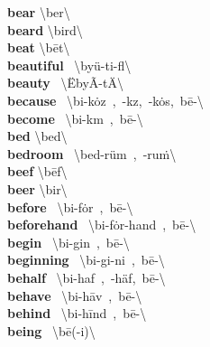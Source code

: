 \documentclass[10pt,a4paper]{article}
\begin{document}
\begin{multicols}{2}
\textbf{ bear }\quad \textbackslash \textprimstress ber\textbackslash \\
\textbf{ beard }\quad \textbackslash \textprimstress bird\textbackslash \\
\textbf{ beat }\quad \textbackslash \textprimstress b\={e}t\textbackslash \\
\textbf{ beautiful }\quad \ \textbackslash \textprimstress by\"{u}-ti-f\textschwa l\textbackslash \\
\textbf{ beauty }\quad \ \textbackslash \"{E}\textsuperscript{\pwedge}by\~{A}\textonequarter -t\"{A}\texttt{\textquotedbl}\textbackslash \\
\textbf{ because }\quad \ \textbackslash bi-\textprimstress k\.{o}z\ ,\ -\textprimstress k\textschwa z,\ -\textprimstress k\.{o}s,\ b\={e}-\textbackslash \\
\textbf{ become }\quad \ \textbackslash bi-\textprimstress k\textschwa m\ ,\ b\={e}-\textbackslash \\
\textbf{ bed }\quad \textbackslash \textprimstress bed\textbackslash \\
\textbf{ bedroom }\quad \ \textbackslash \textprimstress bed-\textsecstress r\"{u}m\ ,\ -\textsecstress ru\. m\textbackslash \\
\textbf{ beef }\quad \textbackslash \textprimstress b\={e}f\textbackslash \\
\textbf{ beer }\quad \textbackslash \textprimstress bir\textbackslash \\
\textbf{ before }\quad \ \textbackslash bi-\textprimstress f\.{o}r\ ,\ b\={e}-\textbackslash \\
\textbf{ beforehand }\quad \ \textbackslash bi-\textprimstress f\.{o}r-\textsecstress hand\ ,\ b\={e}-\textbackslash \\
\textbf{ begin }\quad \ \textbackslash bi-\textprimstress gin\ ,\ b\={e}-\textbackslash \\
\textbf{ beginning }\quad \ \textbackslash bi-\textprimstress gi-ni\engma \ ,\ b\={e}-\textbackslash \\
\textbf{ behalf }\quad \ \textbackslash bi-\textprimstress haf\ ,\ -\textprimstress h\"{a}f,\ b\={e}-\textbackslash \\
\textbf{ behave }\quad \ \textbackslash bi-\textprimstress h\={a}v\ ,\ b\={e}-\textbackslash \\
\textbf{ behind }\quad \ \textbackslash bi-\textprimstress h\={i}nd\ ,\ b\={e}-\textbackslash \\
\textbf{ being }\quad \ \textbackslash \textprimstress b\={e}(-i)\engma \textbackslash \\

\end{multicols}
\end{document}
